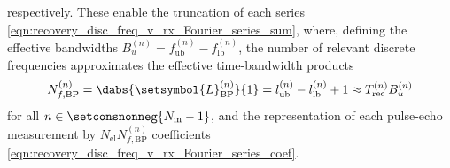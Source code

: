 respectively.
These enable
the truncation of
each  series
\eqref{eqn:recovery_disc_freq_v_rx_Fourier_series_sum}, where, defining
the effective bandwidths
$B_{ u }^{(n)} = f_{\text{ub}}^{(n)} - f_{\text{lb}}^{(n)}$,
the number of
relevant discrete frequencies approximates
the effective time-bandwidth products
\begin{equation}
  N_{f, \text{BP}}^{(n)}
  =
  \dabs{ \setsymbol{L}_{ \text{BP} }^{(n)} }{1}
  =
  l_{\text{ub}}^{(n)} - l_{\text{lb}}^{(n)} + 1
  \approx
  T_{ \text{rec} }^{(n)} B_{ u }^{(n)}
 \label{eqn:recon_disc_axis_f_discrete_BP_TB_product}
\end{equation}
for
all $n \in \setconsnonneg{ N_{\text{in}} - 1 }$, and
the representation of
each pulse-echo measurement by
$N_{\text{el}} N_{f, \text{BP}}^{(n)}$ coefficients
\eqref{eqn:recovery_disc_freq_v_rx_Fourier_series_coef}.
